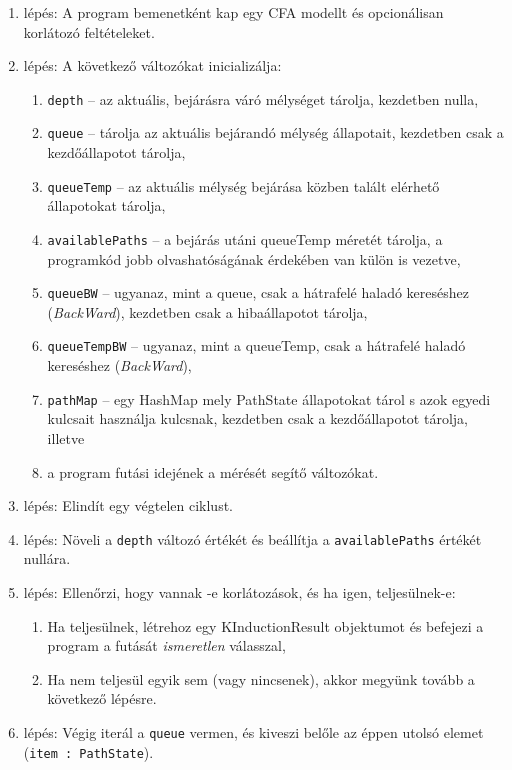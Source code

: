 \begin{enumerate}
	\item lépés: A program bemenetként kap egy CFA modellt és opcionálisan korlátozó feltételeket.
	\item lépés: A következő változókat inicializálja:
	\begin{enumerate}
		\item \texttt{depth} -- az aktuális, bejárásra váró mélységet tárolja, kezdetben nulla,
		\item \texttt{queue} -- tárolja az aktuális bejárandó mélység állapotait, kezdetben csak a kezdőállapotot tárolja,
		\item \texttt{queueTemp} -- az aktuális mélység bejárása közben talált elérhető állapotokat tárolja,
		\item \texttt{availablePaths} -- a bejárás utáni queueTemp méretét tárolja, a programkód jobb olvashatóságának érdekében van külön is vezetve,
		\item \texttt{queueBW} -- ugyanaz, mint a queue, csak a hátrafelé haladó kereséshez (\textit{BackWard}), kezdetben csak a hibaállapotot tárolja,
		\item \texttt{queueTempBW} -- ugyanaz, mint a queueTemp, csak a hátrafelé haladó kereséshez (\textit{BackWard}),
		\item \texttt{pathMap} -- egy HashMap mely PathState állapotokat tárol s azok egyedi kulcsait használja kulcsnak, kezdetben csak a kezdőállapotot tárolja, illetve
		\item a program futási idejének a mérését segítő változókat.
	\end{enumerate}
	\item lépés: Elindít egy végtelen ciklust.
	\item lépés: Növeli a \texttt{depth} változó értékét és beállítja a \texttt{availablePaths} értékét nullára.
	\item lépés: Ellenőrzi, hogy vannak -e korlátozások, és ha igen, teljesülnek-e:
	\begin{enumerate}
		\item Ha teljesülnek, létrehoz egy KInductionResult objektumot és befejezi a program a futását \textit{ismeretlen} válasszal,
		\item Ha nem teljesül egyik sem (vagy nincsenek), akkor megyünk tovább a következő lépésre.
	\end{enumerate}
	\item lépés: Végig iterál a \texttt{queue} vermen, és kiveszi belőle az éppen utolsó elemet (\texttt{item : PathState}).

\end{enumerate}
